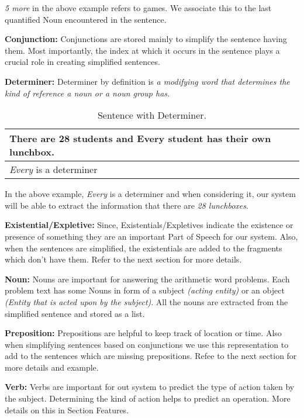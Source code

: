 \documentclass[11pt]{article}
\begin{document}
\textit{5 more} in the above example refers to games. We associate this to the last quantified Noun encountered in the sentence.

\textbf{Conjunction:} Conjunctions are stored mainly to simplify the sentence having them. Most importantly, the index at which it occurs in the sentence plays a crucial role in creating simplified sentences.

\textbf{Determiner:} Determiner by definition is \textit{a modifying word that determines the kind of reference a noun or a noun group has.} 

\begin{table}[h!]
\centering
\begin{tabular}{ | m{25em} | }
\hline
There are 28 students and Every student has their own lunchbox.\\
\hline
\textit{Every} is a determiner\\
\hline
\end{tabular}
\caption{Sentence with Determiner.}
\label{table:2}
\end{table}

In the above example, \textit{Every} is a determiner and when considering it, our system will be able to extract the information that there are \textit{28 lunchboxes}.

\textbf{Existential/Expletive:} Since, Existentials/Expletives indicate the existence or presence of something they are an important Part of Speech for our system. Also, when the sentences are simplified, the existentials are added to the fragments which don't have them. Refer to the next section for more details.

\textbf{Noun:} Nouns are important for answering the arithmetic word problems. Each problem text has some Nouns in form of a subject \textit{(acting entity)} or an object \textit{(Entity that is acted upon by the subject)}. All the nouns are extracted from the simplified sentence and stored as a list. 

\textbf{Preposition:} Prepositions are helpful to keep track of location or time. Also when simplifying sentences based on conjunctions we use this representation to add to the sentences which are missing prepositions. Refee to the next section for more details and example.

\textbf{Verb:} Verbs are important for out system to predict the type of action taken by the subject. Determining the kind of action helps to predict an operation. More details on this in Section Features.
\end{document}
